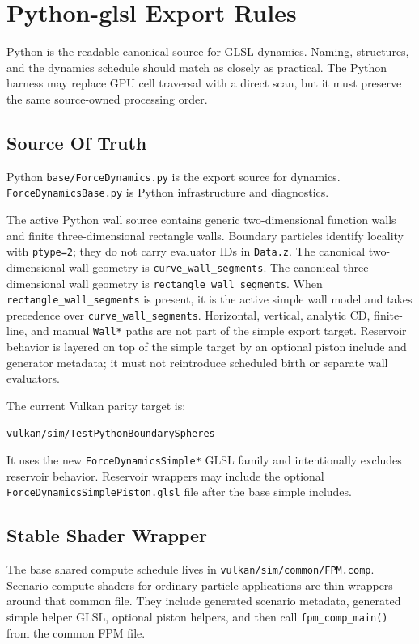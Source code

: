 \section{Python-glsl Export Rules }

Python is the readable canonical source for GLSL dynamics.  Naming,
structures, and the dynamics schedule should match as closely as practical.
The Python harness may replace GPU cell traversal with a direct scan, but it
must preserve the same source-owned processing order.

\subsection{Source Of Truth}

Python \texttt{base/ForceDynamics.py} is the export source for dynamics.
\texttt{ForceDynamicsBase.py} is Python infrastructure and diagnostics.

The active Python wall source contains generic two-dimensional function walls
and finite three-dimensional rectangle walls.  Boundary particles identify
locality with \texttt{ptype=2}; they do not carry evaluator IDs in
\texttt{Data.z}.  The canonical two-dimensional wall geometry is
\texttt{curve\_wall\_segments}.  The canonical three-dimensional wall
geometry is \texttt{rectangle\_wall\_segments}.  When
\texttt{rectangle\_wall\_segments} is present, it is the active simple wall
model and takes precedence over \texttt{curve\_wall\_segments}.  Horizontal,
vertical, analytic CD, finite-line, and manual \texttt{Wall*} paths are not
part of the simple export target.  Reservoir behavior is layered on top of
the simple target by an optional piston include and generator metadata; it
must not reintroduce scheduled birth or separate wall evaluators.

The current Vulkan parity target is:
\begin{verbatim}
vulkan/sim/TestPythonBoundarySpheres
\end{verbatim}
It uses the new \texttt{ForceDynamicsSimple*} GLSL family and intentionally
excludes reservoir behavior.  Reservoir wrappers may include the optional
\texttt{ForceDynamicsSimplePiston.glsl} file after the base simple includes.

\subsection{Stable Shader Wrapper}

The base shared compute schedule lives in
\texttt{vulkan/sim/common/FPM.comp}.  Scenario compute shaders for ordinary
particle applications are thin wrappers around that common file.  They
include generated scenario metadata, generated simple helper GLSL, optional
piston helpers, and then call \texttt{fpm\_comp\_main()} from the common FPM
file.

